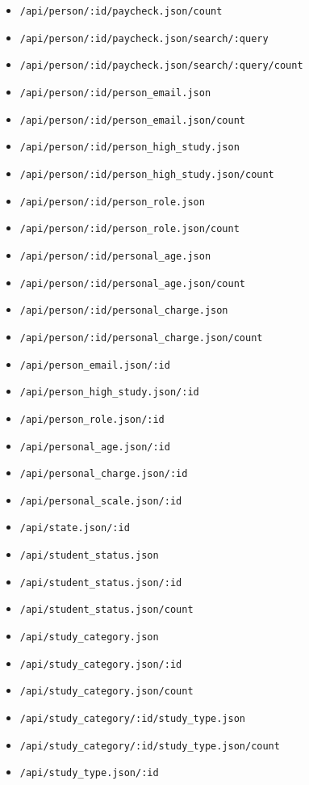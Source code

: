 \begin{itemize}
    \item \lstinline$/api/person/:id/paycheck.json/count$
    \item \lstinline$/api/person/:id/paycheck.json/search/:query$
    \item \lstinline$/api/person/:id/paycheck.json/search/:query/count$
    \item \lstinline$/api/person/:id/person_email.json$
    \item \lstinline$/api/person/:id/person_email.json/count$
    \item \lstinline$/api/person/:id/person_high_study.json$
    \item \lstinline$/api/person/:id/person_high_study.json/count$
    \item \lstinline$/api/person/:id/person_role.json$
    \item \lstinline$/api/person/:id/person_role.json/count$
    \item \lstinline$/api/person/:id/personal_age.json$
    \item \lstinline$/api/person/:id/personal_age.json/count$
    \item \lstinline$/api/person/:id/personal_charge.json$
    \item \lstinline$/api/person/:id/personal_charge.json/count$
    \item \lstinline$/api/person_email.json/:id$
    \item \lstinline$/api/person_high_study.json/:id$
    \item \lstinline$/api/person_role.json/:id$
    \item \lstinline$/api/personal_age.json/:id$
    \item \lstinline$/api/personal_charge.json/:id$
    \item \lstinline$/api/personal_scale.json/:id$
    \item \lstinline$/api/state.json/:id$
    \item \lstinline$/api/student_status.json$
    \item \lstinline$/api/student_status.json/:id$
    \item \lstinline$/api/student_status.json/count$
    \item \lstinline$/api/study_category.json$
    \item \lstinline$/api/study_category.json/:id$
    \item \lstinline$/api/study_category.json/count$
    \item \lstinline$/api/study_category/:id/study_type.json$
    \item \lstinline$/api/study_category/:id/study_type.json/count$
    \item \lstinline$/api/study_type.json/:id$
  \end{itemize}
\endgroup
